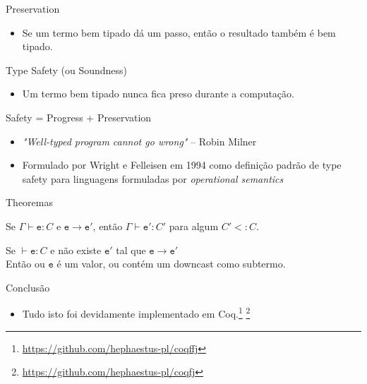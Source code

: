 \documentclass{beamer}
\begin{document}
    \begin{frame}{Preservation}
        \begin{itemize}
            \item Se um termo bem tipado dá um passo, então o resultado também é bem tipado.
        \end{itemize}
    \end{frame}

    \begin{frame}{Type Safety (ou Soundness)}
        \begin{itemize}
        \item Um termo bem tipado nunca fica preso durante a computação.
        \end{itemize}
    \end{frame}

    \begin{frame}{Safety = Progress + Preservation}
        \begin{itemize}
            \item \emph{"Well-typed program cannot go wrong"} -- Robin Milner 

            \item<2-> Formulado por Wright e Felleisen em 1994 como definição padrão de
            type safety para linguagens formuladas por \emph{operational semantics}
        \end{itemize}
    \end{frame}


    \begin{frame}{Theoremas}
        \begin{theorem}[Preservation]
            Se $\Gamma \vdash \mathtt{e} : C$ e $\mathtt{e} \rightarrow \mathtt{e'}$,
            então $\Gamma \vdash \mathtt{e'}: C'$ para algum $C' <: C$.
        \end{theorem}
        \begin{theorem}[Progress]
            Se $\vdash \mathtt{e} : C$ e não existe $\mathtt{e'}$ tal que $\mathtt{e} \rightarrow \mathtt{e'}$\\
            Então ou $\mathtt{e}$ é um valor, ou contém um downcast como subtermo.
        \end{theorem}
    \end{frame}

    \begin{frame}{Conclusão}
        \begin{itemize}
            \item Tudo isto foi devidamente implementado em Coq.\footnote{\url{https://github.com/hephaestus-pl/coqffj}}
            \footnote{\url{https://github.com/hephaestus-pl/coqfj}}
        \end{itemize}
    \end{frame}
\end{document}
